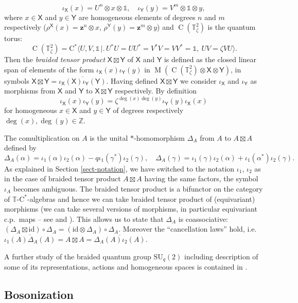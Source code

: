 \documentclass[12pt,reqno,a4paper]{amsart}
\theoremstyle{definition}
\newcommand{\cst}{\ensuremath{\mathrm{C}^*}}
\newcommand{\comp}{\circ}
\newcommand{\I}{\mathds{1}}
\newcommand{\id}{\mathrm{id}}
\newcommand{\tens}{\otimes}
\newcommand{\TT}{\mathbb{T}}
\newcommand{\ZZ}{\mathbb{Z}}
\newcommand{\sX}{\mathsf{X}}
\newcommand{\sY}{\mathsf{Y}}
\newcommand{\bz}{{\boldsymbol{z}}}
\DeclareMathOperator{\C}{C}
\DeclareMathOperator{\M}{M}
\newcommand{\SU}{\mathrm{SU}}
\numberwithin{equation}{section}
\begin{document}
\[
\iota_{\sX}(x)=U^n\tens x\tens\I,\quad
\iota_{\sY}(y)=V^m\tens\I\tens y,
\]
where $x\in\sX$ and $y\in\sY$ are homogeneous elements of degrees $n$ and $m$ respectively ($\rho^\sX(x)=\bz^n\tens x$, $\rho^\sY(y)=\bz^m\tens y$) and $\C(\TT^2_\zeta)$ is the quantum torus:
\[
\C(\TT^2_\zeta)=\cst\bigl\langle U,V,\I\,\bigr|\bigl.\,U^*U=UU^*=V^*V=VV^*=\I,\:UV=\zeta VU\bigr\rangle.
\]
Then the \emph{braided tensor product} $\sX\boxtimes\sY$ of $\sX$ and $\sY$ is defined as the closed linear span of elements of the form $\iota_\sX(x)\iota_\sY(y)$ in $\M(\C(\TT^2_\zeta)\tens\sX\tens\sY)$, in symbols $\sX\boxtimes\sY=\overline{\iota_\sX(\sX)\iota_\sY(\sY)}$. Having defined $\sX\boxtimes\sY$ we consider $\iota_\sX$ and $\iota_\sY$ as morphisms from $\sX$ and $\sY$ to $\sX\boxtimes\sY$ respectively. By definition
\[
\iota_{\sX}(x)\iota_{\sY}(y)=\zeta^{\deg(x)\deg(y)} \iota_{\sY}(y)\iota_{\sX}(x)
\]
for homogeneous $x\in\sX$ and $y\in\sY$ of degrees respectively $\deg(x),\deg(y)\in\ZZ$.

The comultiplication on $A$ is the unital $*$-homomorphism $\Delta_A$ from $A$ to $A\boxtimes A$ defined by
\[
\Delta_A(\alpha)=\iota_1(\alpha)\iota_2(\alpha)-q\iota_1(\gamma^*)\iota_2(\gamma),\quad
\Delta_A(\gamma)=\iota_1(\gamma)\iota_2(\alpha)+\iota_1(\alpha^*)\iota_2(\gamma).
\]
As explained in Section \ref{sect-notation}, we have switched to the notation $\iota_1$, $\iota_2$ as in the case of braided tensor product $A\boxtimes A$ having the same factors, the symbol $\iota_A$ becomes ambiguous. The braided tensor product is a bifunctor on the category of $\TT$-\cst-algebras and hence we can take braided tensor product of (equivariant) morphisms (we can take several versions of morphisms, in particular equivariant c.p.~maps -- see \cite[Section 5.2]{MeyerRoyWoronowiczI} and \cite[Proposition 5.1]{DeCommerKrajczok}). This allows us to state that $\Delta_A$ is coassociative: $(\Delta_A\boxtimes\id)\comp\Delta_A=(\id\tens\Delta_A)\comp\Delta_A$. Moreover the ``cancellation laws'' hold, i.e.~$\overline{\iota_1(A)\Delta_A(A)}=A\boxtimes A=\overline{\Delta_A(A)\iota_2(A)}$.

A further study of the braided quantum group $\SU_q(2)$ including description of some of its representations, actions and homogeneous spaces is contained in \cite{BraidedPodlesSpheres}.

\subsection{Bosonization}\label{sect-boson}
\end{document}
